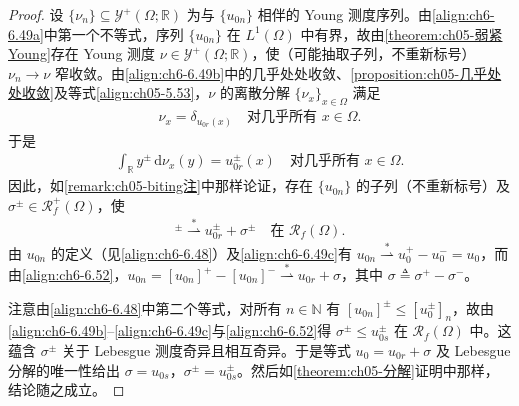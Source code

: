 \documentclass[../../main.tex]{subfiles}%
\begin{document}
\begin{proof}
设 $\{\nu_n\}\subseteq\mathcal{Y}^+(\Omega;\mathbb{R})$ 为与 $\{u_{0n}\}$ 相伴的 Young 测度序列。由\eqref{align:ch6-6.49a}中第一个不等式，序列 $\{u_{0n}\}$ 在 $L^1(\Omega)$ 中有界，故由\cref{theorem:ch05-弱紧Young}存在 Young 测度 $\nu\in\mathcal{Y}^+(\Omega;\mathbb{R})$，使（可能抽取子列，不重新标号）$\nu_n\to\nu$ 窄收敛。由\eqref{align:ch6-6.49b}中的几乎处处收敛、\cref{proposition:ch05-几乎处处收敛}及等式\eqref{align:ch05-5.53}，$\nu$ 的离散分解 $\{\nu_x\}_{x\in\Omega}$ 满足
\begin{align*}
\nu_x=\delta_{u_{0r}(x)}\quad\text{对几乎所有 }x\in\Omega.
\end{align*}
于是
\begin{align*}
\int_\mathbb{R}y^\pm\,\mathrm{d}\nu_x(y)=u^\pm_{0r}(x)\quad\text{对几乎所有 }x\in\Omega.
\end{align*}
因此，如\cref{remark:ch05-biting注}中那样论证，存在 $\{u_{0n}\}$ 的子列（不重新标号）及 $\sigma^\pm\in\mathscr{R}^+_f(\Omega)$，使
\begin{align}
[u_{0n}]^\pm\stackrel{*}{\rightharpoonup}u^\pm_{0r}+\sigma^\pm\quad\text{在 }\mathscr{R}_f(\Omega). \label{align:ch6-6.52}
\end{align}
由 $u_{0n}$ 的定义（见\eqref{align:ch6-6.48}）及\eqref{align:ch6-6.49c}有 $u_{0n}\stackrel{*}{\rightharpoonup}u^+_0-u^-_0=u_0$，而由\eqref{align:ch6-6.52}，$u_{0n}=[u_{0n}]^+-[u_{0n}]^-\stackrel{*}{\rightharpoonup}u_{0r}+\sigma$，其中 $\sigma\triangleq\sigma^+-\sigma^-$。

注意由\eqref{align:ch6-6.48}中第二个等式，对所有 $n\in\mathbb{N}$ 有 $[u_{0n}]^\pm\leqslant[u^\pm_0]_n$，故由\eqref{align:ch6-6.49b}--\eqref{align:ch6-6.49c}与\eqref{align:ch6-6.52}得 $\sigma^\pm\leqslant u^\pm_{0s}$ 在 $\mathscr{R}_f(\Omega)$ 中。这蕴含 $\sigma^\pm$ 关于 Lebesgue 测度奇异且相互奇异。于是等式 $u_0=u_{0r}+\sigma$ 及 Lebesgue 分解的唯一性给出 $\sigma=u_{0s}$，$\sigma^\pm=u^\pm_{0s}$。然后如\cref{theorem:ch05-分解}证明中那样，结论随之成立。
\end{proof}
\end{document}
